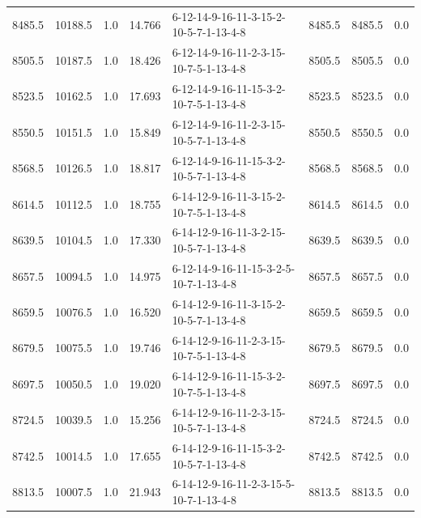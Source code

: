 \begin{tabular}{rrrrlrrr}
  8485.5 &  10188.5 &            1.0 &             14.766 &  6-12-14-9-16-11-3-15-2-10-5-7-1-13-4-8 &        8485.5 &          8485.5 &       0.0 \\
  8505.5 &  10187.5 &            1.0 &             18.426 &  6-12-14-9-16-11-2-3-15-10-7-5-1-13-4-8 &        8505.5 &          8505.5 &       0.0 \\
  8523.5 &  10162.5 &            1.0 &             17.693 &  6-12-14-9-16-11-15-3-2-10-7-5-1-13-4-8 &        8523.5 &          8523.5 &       0.0 \\
  8550.5 &  10151.5 &            1.0 &             15.849 &  6-12-14-9-16-11-2-3-15-10-5-7-1-13-4-8 &        8550.5 &          8550.5 &       0.0 \\
  8568.5 &  10126.5 &            1.0 &             18.817 &  6-12-14-9-16-11-15-3-2-10-5-7-1-13-4-8 &        8568.5 &          8568.5 &       0.0 \\
  8614.5 &  10112.5 &            1.0 &             18.755 &  6-14-12-9-16-11-3-15-2-10-7-5-1-13-4-8 &        8614.5 &          8614.5 &       0.0 \\
  8639.5 &  10104.5 &            1.0 &             17.330 &  6-14-12-9-16-11-3-2-15-10-5-7-1-13-4-8 &        8639.5 &          8639.5 &       0.0 \\
  8657.5 &  10094.5 &            1.0 &             14.975 &  6-12-14-9-16-11-15-3-2-5-10-7-1-13-4-8 &        8657.5 &          8657.5 &       0.0 \\
  8659.5 &  10076.5 &            1.0 &             16.520 &  6-14-12-9-16-11-3-15-2-10-5-7-1-13-4-8 &        8659.5 &          8659.5 &       0.0 \\
  8679.5 &  10075.5 &            1.0 &             19.746 &  6-14-12-9-16-11-2-3-15-10-7-5-1-13-4-8 &        8679.5 &          8679.5 &       0.0 \\
  8697.5 &  10050.5 &            1.0 &             19.020 &  6-14-12-9-16-11-15-3-2-10-7-5-1-13-4-8 &        8697.5 &          8697.5 &       0.0 \\
  8724.5 &  10039.5 &            1.0 &             15.256 &  6-14-12-9-16-11-2-3-15-10-5-7-1-13-4-8 &        8724.5 &          8724.5 &       0.0 \\
  8742.5 &  10014.5 &            1.0 &             17.655 &  6-14-12-9-16-11-15-3-2-10-5-7-1-13-4-8 &        8742.5 &          8742.5 &       0.0 \\
  8813.5 &  10007.5 &            1.0 &             21.943 &  6-14-12-9-16-11-2-3-15-5-10-7-1-13-4-8 &        8813.5 &          8813.5 &       0.0 \\

\end{tabular}
